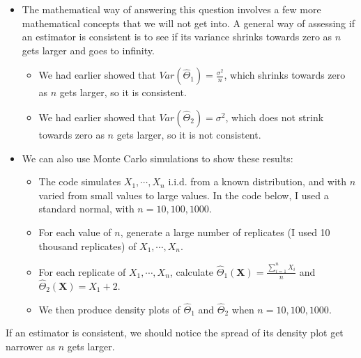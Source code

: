 \documentclass[
]{book}
\providecommand{\tightlist}{%
  \setlength{\itemsep}{0pt}\setlength{\parskip}{0pt}}
\begin{document}
\begin{itemize}
\item
  The mathematical way of answering this question involves a few more mathematical concepts that we will not get into. A general way of assessing if an estimator is consistent is to see if its variance shrinks towards zero as \(n\) gets larger and goes to infinity.

  \begin{itemize}
  \item
    We had earlier showed that \(Var(\hat{\Theta}_1) = \frac{\sigma^2}{n}\), which shrinks towards zero as \(n\) gets larger, so it is consistent.
  \item
    We had earlier showed that \(Var(\hat{\Theta}_2) = \sigma^2\), which does not strink towards zero as \(n\) gets larger, so it is not consistent.
  \end{itemize}
\item
  We can also use Monte Carlo simulations to show these results:

  \begin{itemize}
  \tightlist
  \item
    The code simulates \(X_1, \cdots, X_{n}\) i.i.d. from a known distribution, and with \(n\) varied from small values to large values. In the code below, I used a standard normal, with \(n=10, 100, 1000\).\\
  \item
    For each value of \(n\), generate a large number of replicates (I used 10 thousand replicates) of \(X_1, \cdots, X_{n}\).
  \item
    For each replicate of \(X_1, \cdots, X_{n}\), calculate \(\hat{\Theta}_1(\boldsymbol{X}) = \frac{\sum_{i=1}^n X_i}{n}\) and \(\hat{\Theta}_2(\boldsymbol{X}) = X_1 + 2\).
  \item
    We then produce density plots of \(\hat{\Theta}_1\) and \(\hat{\Theta}_2\) when \(n=10, 100, 1000\).
  \end{itemize}
\end{itemize}

If an estimator is consistent, we should notice the spread of its density plot get narrower as \(n\) gets larger.
\end{document}

